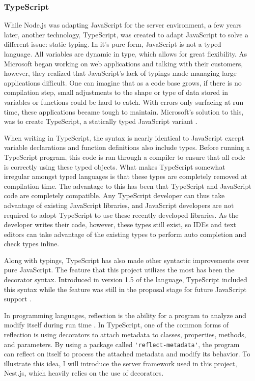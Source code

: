 \subsubsection{TypeScript} \label{sec:typescript}
While Node.js was adapting JavaScript for the server environment, a few years later, another technology, TypeScript, was created to adapt JavaScript to solve a different issue: static typing.  In it's pure form, JavaScript is not a typed language.  All variables are dynamic in type, which allows for great flexibility.  As Microsoft began working on web applications and talking with their customers, however, they realized that JavaScript's lack of typings made managing large applications difficult.  One can imagine that as a code base grows, if there is no compilation step, small adjustments to the shape or type of data stored in variables or functions could be hard to catch.  With errors only surfacing at run-time, these applications became tough to maintain.  Microsoft's solution to this, was to create TypeScript, a statically typed JavaScript variant \cite{idgnewsservicestaffMicrosoftAugmentsJavaScript2012}.

When writing in TypeScript, the syntax is nearly identical to JavaScript except variable declarations and function definitions also include types.  Before running a TypeScript program, this code is ran through a compiler to ensure that all code is correctly using these typed objects. What makes TypeScript somewhat irregular amongst typed languages is that these types are completely removed at compilation time. The advantage to this has been that TypeScript and JavaScript code are completely compatible.  Any TypeScript developer can thus take advantage of existing JavaScript libraries, and JavaScript developers are not required to adopt TypeScript to use these recently developed libraries.  As the developer writes their code, however, these types still exist, so IDEs and text editors can take advantage of the existing types to perform auto completion and check types inline.

Along with typings, TypeScript has also made other syntactic improvements over pure JavaScript.  The feature that this project utilizes the most has been the decorator syntax.  Introduced in version 1.5 of the language, TypeScript included this syntax while the feature was still in the proposal stage for future JavaScript support \cite{turnerAnnouncingTypeScript2015}.

In programming languages, reflection is the ability for a program to analyze and modify itself during run time \cite{malenfantTutorialBehavioralReflection1996}.  In TypeScript, one of the common forms of reflection is using decorators to attach metadata to classes, properties, methods, and parameters.  By using a package called \Verb!'reflect-metadata'!, the program can reflect on itself to process the attached metadata and modify its behavior.  To illustrate this idea, I will introduce the server framework used in this project, Nest.js, which heavily relies on the use of decorators.

